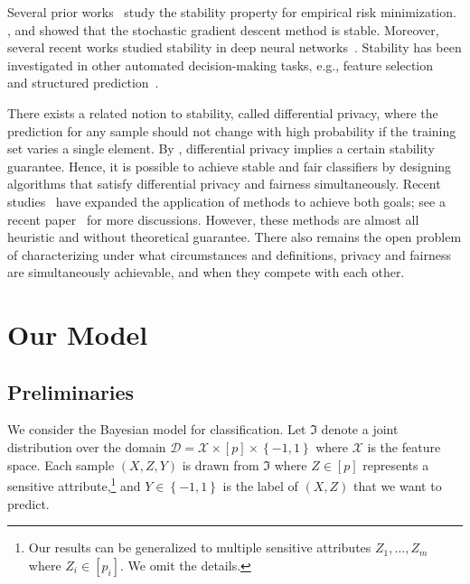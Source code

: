 \documentclass[11pt]{article}
\newcommand{\calD}{\mathcal{D}}
\newcommand{\calX}{\mathcal{X}}
\begin{document}
	Several prior works~\cite{bousquet2002stability,shalev2010learnability,maurer2017second,meng2017generalization} study the stability property for empirical risk minimization.
	\cite{hardt2016train}, \cite{london2016generalization}
	and \cite{kuzborskij2018data} showed that the stochastic gradient descent method is stable.
	Moreover, several recent works studied stability in deep neural networks~\cite{raghu2017expressive,vidal2017mathematics}.
	Stability has been investigated in other automated decision-making tasks, e.g., feature selection~\cite{nogueira2018on} and structured prediction~\cite{london2013collective,london2014pac,london2016stability}.
	
	There exists a related notion to stability, called differential privacy, where the prediction for any sample should not change with high probability if the training set varies a single element. 
	By \cite{wang2016learning}, differential privacy implies a certain stability guarantee. 
	Hence, it is possible to achieve stable and fair classifiers by designing algorithms that satisfy differential privacy and fairness simultaneously.
	Recent studies~\cite{hajian2016algorithmic,hajian2015discrimination,kashid2015discrimination,kashid2017discrimination,ruggieri2014anti} have expanded the application of methods to achieve both goals; see a recent paper~\cite{ekstrand2018privacy} for more discussions.
	However, these methods are almost all heuristic and without theoretical guarantee.
	There also remains the open problem of characterizing under what circumstances and definitions, privacy and fairness are simultaneously achievable, and when they compete with each other.
	
	
	
	
	\section{Our Model}
	\label{sec:pre}
	
	\subsection{Preliminaries}
	We consider the Bayesian model for classification. 
	Let $\Im$ denote a joint distribution over the domain $\calD=\calX\times [p]\times\left\{-1,1\right\}$ where $\calX$ is the feature space.
	Each sample $(X,Z,Y)$ is drawn from $\Im$ where $Z\in [p]$ represents a sensitive attribute,\footnote{Our results can be generalized to multiple sensitive attributes $Z_1,\ldots,Z_m$ where $Z_i\in [p_i]$. We omit the details.} and $Y\in \left\{-1,1\right\}$ is the label of $(X,Z)$ that we want to predict.
	
\end{document}
